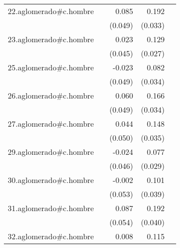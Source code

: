{\begin{longtable}{l*{4}{D{.}{.}{-1}}}
\addlinespace
22.aglomerado#c.hombre&                     &       0.085         &       0.192\sym{***}&                     \\
            &                     &     (0.049)         &     (0.033)         &                     \\
\addlinespace
23.aglomerado#c.hombre&                     &       0.023         &       0.129\sym{***}&                     \\
            &                     &     (0.045)         &     (0.027)         &                     \\
\addlinespace
25.aglomerado#c.hombre&                     &      -0.023         &       0.082\sym{*}  &                     \\
            &                     &     (0.049)         &     (0.034)         &                     \\
\addlinespace
26.aglomerado#c.hombre&                     &       0.060         &       0.166\sym{***}&                     \\
            &                     &     (0.049)         &     (0.034)         &                     \\
\addlinespace
27.aglomerado#c.hombre&                     &       0.044         &       0.148\sym{***}&                     \\
            &                     &     (0.050)         &     (0.035)         &                     \\
\addlinespace
29.aglomerado#c.hombre&                     &      -0.024         &       0.077\sym{**} &                     \\
            &                     &     (0.046)         &     (0.029)         &                     \\
\addlinespace
30.aglomerado#c.hombre&                     &      -0.002         &       0.101\sym{**} &                     \\
            &                     &     (0.053)         &     (0.039)         &                     \\
\addlinespace
31.aglomerado#c.hombre&                     &       0.087         &       0.192\sym{***}&                     \\
            &                     &     (0.054)         &     (0.040)         &                     \\
\addlinespace
32.aglomerado#c.hombre&                     &       0.008         &       0.115\sym{***}&                     \\

\end{longtable}}
